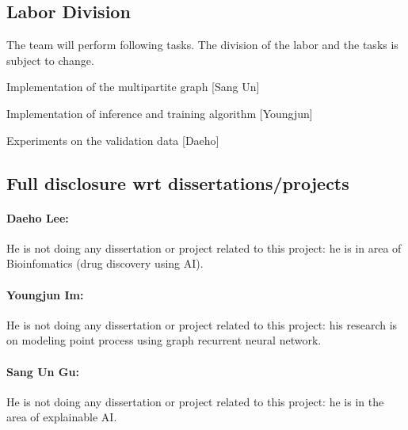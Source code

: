 \subsection{Labor Division}

The team will perform following tasks. The division of the labor and the tasks is subject to change.
\bit
\item Implementation of the multipartite graph [Sang Un]
\item Implementation of inference and training algorithm [Youngjun]
\item Experiments on the validation data [Daeho]
\eit

\subsection{Full disclosure wrt dissertations/projects}

\paragraph{Daeho Lee:}
He is not doing any dissertation or project related to this project: he is in area of Bioinfomatics (drug discovery using AI).

\paragraph{Youngjun Im:}
He is not doing any dissertation or project related to this project: his research is on modeling point process using graph recurrent neural network.

\paragraph{Sang Un Gu:}
He is not doing any dissertation or project related to this project: he is in the area of explainable AI.
